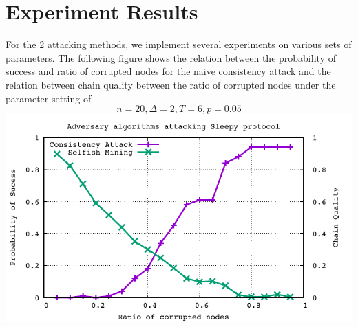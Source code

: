 \documentclass[
10pt, %
a4paper, %
oneside, %
headinclude,footinclude, %
BCOR5mm, %
]{scrartcl}
\begin{document}
\section{Experiment Results}
For the 2 attacking methods, we implement several experiments on various sets of parameters. The following figure shows the relation between the probability of success and ratio of corrupted nodes for the naive consistency attack and the relation between chain quality between the ratio of corrupted nodes under the parameter setting of 
\[
	n=20,\Delta = 2, T = 6, p = 0.05
\]
\includegraphics{Figures/results}

\renewcommand{\refname}{\spacedlowsmallcaps{References}} %




\end{document}
